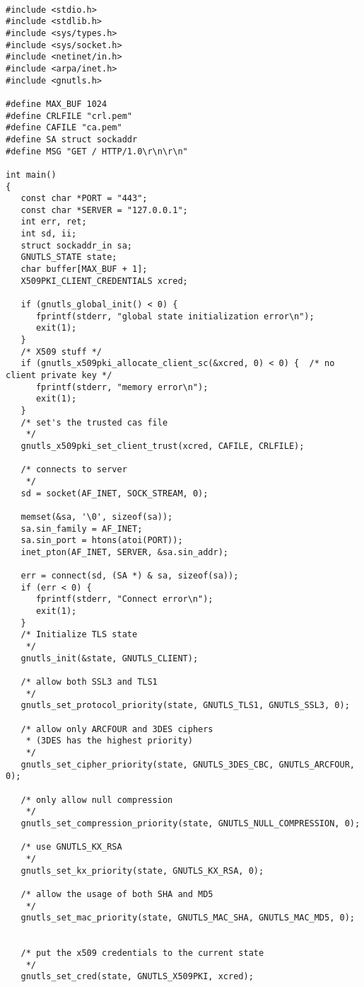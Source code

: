 \begin{verbatim}

#include <stdio.h>
#include <stdlib.h>
#include <sys/types.h>
#include <sys/socket.h>
#include <netinet/in.h>
#include <arpa/inet.h>
#include <gnutls.h>

#define MAX_BUF 1024
#define CRLFILE "crl.pem"
#define CAFILE "ca.pem"
#define SA struct sockaddr
#define MSG "GET / HTTP/1.0\r\n\r\n"

int main()
{
   const char *PORT = "443";
   const char *SERVER = "127.0.0.1";
   int err, ret;
   int sd, ii;
   struct sockaddr_in sa;
   GNUTLS_STATE state;
   char buffer[MAX_BUF + 1];
   X509PKI_CLIENT_CREDENTIALS xcred;

   if (gnutls_global_init() < 0) {
      fprintf(stderr, "global state initialization error\n");
      exit(1);
   }
   /* X509 stuff */
   if (gnutls_x509pki_allocate_client_sc(&xcred, 0) < 0) {  /* no client private key */
      fprintf(stderr, "memory error\n");
      exit(1);
   }
   /* set's the trusted cas file
    */
   gnutls_x509pki_set_client_trust(xcred, CAFILE, CRLFILE);

   /* connects to server 
    */
   sd = socket(AF_INET, SOCK_STREAM, 0);

   memset(&sa, '\0', sizeof(sa));
   sa.sin_family = AF_INET;
   sa.sin_port = htons(atoi(PORT));
   inet_pton(AF_INET, SERVER, &sa.sin_addr);

   err = connect(sd, (SA *) & sa, sizeof(sa));
   if (err < 0) {
      fprintf(stderr, "Connect error\n");
      exit(1);
   }
   /* Initialize TLS state 
    */
   gnutls_init(&state, GNUTLS_CLIENT);

   /* allow both SSL3 and TLS1
    */
   gnutls_set_protocol_priority(state, GNUTLS_TLS1, GNUTLS_SSL3, 0);

   /* allow only ARCFOUR and 3DES ciphers
    * (3DES has the highest priority)
    */
   gnutls_set_cipher_priority(state, GNUTLS_3DES_CBC, GNUTLS_ARCFOUR, 0);

   /* only allow null compression
    */
   gnutls_set_compression_priority(state, GNUTLS_NULL_COMPRESSION, 0);

   /* use GNUTLS_KX_RSA
    */
   gnutls_set_kx_priority(state, GNUTLS_KX_RSA, 0);

   /* allow the usage of both SHA and MD5
    */
   gnutls_set_mac_priority(state, GNUTLS_MAC_SHA, GNUTLS_MAC_MD5, 0);


   /* put the x509 credentials to the current state
    */
   gnutls_set_cred(state, GNUTLS_X509PKI, xcred);



\end{verbatim}
